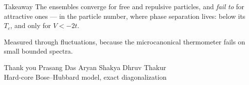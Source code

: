\documentclass[10pt,aspectratio=169]{beamer}
\begin{document}
\begin{frame}[standout]{Takeaway}
  The ensembles converge for free and repulsive particles,
  and \emph{fail to} for attractive ones --- in the particle number, where
  phase separation lives: below its $T_c$, and only for $V<-2t$.

  \vspace{0.5em}
  Measured through fluctuations, because the microcanonical thermometer fails on
  small bounded spectra.
\end{frame}

\appendix
\begin{frame}[standout]{Thank you}
  \centering
  Prasang Das \quad Aryan Shakya \quad Dhruv Thakur\\[0.5em]
  {\footnotesize Hard-core Bose--Hubbard model, exact diagonalization}
\end{frame}
\end{document}
